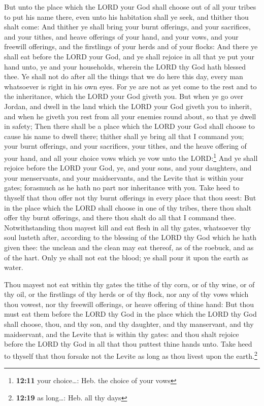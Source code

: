  But unto the place which the LORD your God shall choose
out of all your tribes to put his name there, even unto his habitation
shall ye seek, and thither thou shalt come:  And thither
ye shall bring your burnt offerings, and your sacrifices, and your
tithes, and heave offerings of your hand, and your vows, and your
freewill offerings, and the firstlings of your herds and of your flocks:
 And there ye shall eat before the LORD your God, and ye
shall rejoice in all that ye put your hand unto, ye and your households,
wherein the LORD thy God hath blessed thee.  Ye shall not
do after all the things that we do here this day, every man whatsoever
is right in his own eyes.  For ye are not as yet come to
the rest and to the inheritance, which the LORD your God giveth you.
 But when ye go over Jordan, and dwell in the land which
the LORD your God giveth you to inherit, and when he giveth you rest
from all your enemies round about, so that ye dwell in safety;
 Then there shall be a place which the LORD your God
shall choose to cause his name to dwell there; thither shall ye bring
all that I command you; your burnt offerings, and your sacrifices, your
tithes, and the heave offering of your hand, and all your choice vows
which ye vow unto the LORD:\footnote{\textbf{12:11} your choice\ldots:
  Heb. the choice of your vows}  And ye shall rejoice
before the LORD your God, ye, and your sons, and your daughters, and
your menservants, and your maidservants, and the Levite that is within
your gates; forasmuch as he hath no part nor inheritance with you.
 Take heed to thyself that thou offer not thy burnt
offerings in every place that thou seest:  But in the
place which the LORD shall choose in one of thy tribes, there thou shalt
offer thy burnt offerings, and there thou shalt do all that I command
thee.  Notwithstanding thou mayest kill and eat flesh in
all thy gates, whatsoever thy soul lusteth after, according to the
blessing of the LORD thy God which he hath given thee: the unclean and
the clean may eat thereof, as of the roebuck, and as of the hart.
 Only ye shall not eat the blood; ye shall pour it upon
the earth as water.

 Thou mayest not eat within thy gates the tithe of thy
corn, or of thy wine, or of thy oil, or the firstlings of thy herds or
of thy flock, nor any of thy vows which thou vowest, nor thy freewill
offerings, or heave offering of thine hand:  But thou
must eat them before the LORD thy God in the place which the LORD thy
God shall choose, thou, and thy son, and thy daughter, and thy
manservant, and thy maidservant, and the Levite that is within thy
gates: and thou shalt rejoice before the LORD thy God in all that thou
puttest thine hands unto.  Take heed to thyself that thou
forsake not the Levite as long as thou livest upon the earth.\footnote{\textbf{12:19}
  as long\ldots: Heb. all thy days}

